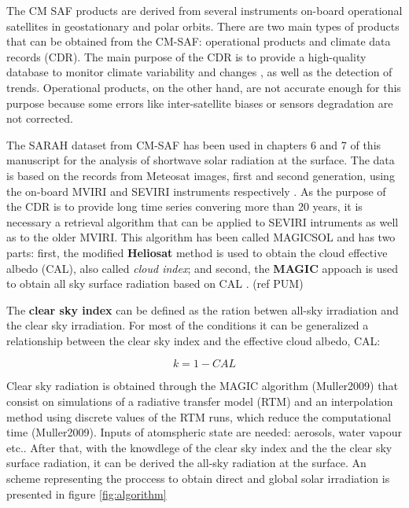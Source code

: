 The CM SAF products are derived from several instruments on-board operational satellites in geostationary and polar orbits. There are two main types of products that can be obtained from the CM-SAF: operational products and climate data records (CDR). The main purpose of the CDR is to provide a high-quality database to monitor climate variability and changes \cite*{Muller2015}, as well as the detection of trends. Operational products, on the other hand, are not accurate enough for this purpose because some errors like inter-satellite biases or sensors degradation are not corrected.


The SARAH dataset from CM-SAF has been used in chapters 6 and 7 of this manuscript for the analysis of shortwave solar radiation at the surface. The data is based on the records from Meteosat images, first and second generation, using the on-board MVIRI and SEVIRI instruments respectively \cite*{posselts2012}. As the purpose of the CDR is to provide long time series convering more than 20 years, it is necessary a retrieval algorithm that can be applied to SEVIRI intruments as well as to the older MVIRI. This algorithm has been called MAGICSOL and has two parts: first, the modified \textbf{Heliosat} method is used to obtain the cloud effective albedo (CAL), also called \textit{cloud index};  and second, the \textbf{MAGIC} appoach is used to obtain all sky surface radiation based on CAL \cite*{posselts2012}. (ref PUM)

The \textbf{clear sky index} can be defined as the ration betwen all-sky irradiation and the clear sky irradiation. For most of the conditions it can be generalized a relationship between the clear sky index and the effective cloud albedo, CAL:

\begin{equation}
  k=1-CAL
\end{equation}

Clear sky radiation is obtained through the MAGIC algorithm (Muller2009) that consist on simulations of a radiative transfer model (RTM) and an interpolation method using discrete values of the RTM runs, which reduce the computational time (Muller2009). Inputs of atomspheric state are needed: aerosols, water vapour etc.. After that, with the knowdlege of the clear sky index and the the clear sky surface radiation, it can be derived the all-sky radiation at the surface. An scheme representing the proccess to obtain direct and global solar irradiation is presented in figure \ref{fig:algorithm}\\

